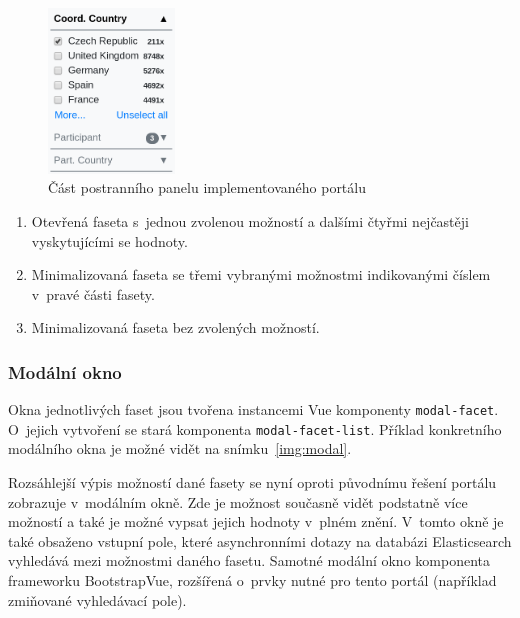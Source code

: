 \begin{figure}[H]
	\centering
	\includegraphics[width=0.3\textwidth]{obrazky-figures/my-facet.png}
	\caption{Část postranního panelu implementovaného portálu}
	\label{img:sidebar}
\end{figure}
\begin{enumerate}
    \item Otevřená faseta  s~jednou zvolenou možností a dalšími čtyřmi nejčastěji vyskytujícími se hodnoty. %
    \item Minimalizovaná faseta  se třemi vybranými možnostmi indikovanými číslem v~pravé části fasety.
    \item Minimalizovaná faseta  bez zvolených možností.
\end{enumerate}


\subsubsection*{Modální okno}
Okna jednotlivých faset jsou tvořena instancemi Vue komponenty \texttt{modal-facet}. O~jejich vytvoření se stará komponenta \texttt{modal-facet-list}. Příklad konkretního modálního okna je možné vidět na snímku~\ref{img:modal}.

Rozsáhlejší výpis možností dané fasety se nyní oproti původnímu řešení portálu zobrazuje v~modálním okně. Zde je možnost současně vidět podstatně více možností a také je možné vypsat jejich hodnoty v~plném znění. V~tomto okně je také obsaženo vstupní pole, které asynchronními dotazy na databázi Elasticsearch vyhledává mezi možnostmi daného fasetu. Samotné modální okno komponenta frameworku BootstrapVue, rozšířená o~prvky nutné pro tento portál (například zmiňované vyhledávací pole).


